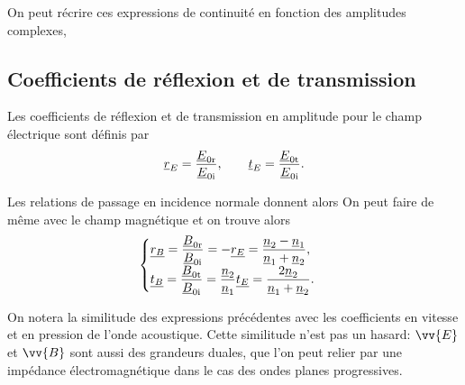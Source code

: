 \documentclass[12pt,fancy]{cours}%
\begin{document}
On peut récrire ces expressions de continuité en fonction des amplitudes complexes,


\subsection{Coefficients de réflexion et de transmission}
\begin{definition}\label{def:}
  Les coefficients de réflexion et de transmission en amplitude pour le champ électrique sont définis par
  \begin{equation}
  \underline{r}_{E}=\dfrac{\underline{E}_{0\rm{r}}}{\underline{E}_{0\rm{i}}}, \qquad
  \underline{t}_{E}=\dfrac{\underline{E}_{0\rm{t}}}{\underline{E}_{0\rm{i}}}.
  \end{equation}
\end{definition}
Les relations de passage en incidence normale donnent alors
On peut faire de même avec le champ magnétique et on trouve alors
\begin{equation}
\begin{cases}
\underline{r_{B}}=\dfrac{\underline{B}_{0\rm{r}}}{\underline{B}_{0\rm{i}}}=-\underline{r_{E}}=\dfrac{\underline{n}_2-\underline{n}_1}{\underline{n}_1+\underline{n}_2},\\[2mm]
\underline{t_{B}}=\dfrac{\underline{B}_{0\rm{t}}}{\underline{B}_{0\rm{i}}}=\dfrac{\underline{n}_2}{\underline{n}_1}\underline{t_{E}}=\dfrac{2\underline{n}_2}{\underline{n}_1+\underline{n}_2}.
\end{cases}
\end{equation}
\begin{remarque}
On notera la similitude des expressions précédentes avec les coefficients en vitesse et en pression de l'onde acoustique. Cette similitude n'est pas un hasard: $\vv{E}$ et $\vv{B}$ sont aussi des grandeurs duales, que l'on peut relier par une impédance électromagnétique dans le cas des ondes planes progressives.
\end{remarque}
\end{document}
